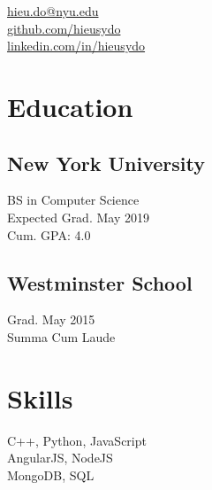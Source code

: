 \documentclass[]{hieudo-build}
\begin{document}
%
%
{
	\faEnvelope \href{mailto:hieu.do@nyu.edu}{ hieu.do@nyu.edu}\\
	\faGithub \href{https://github.com/hieusydo}{   github.com/hieusydo}\\
	\faLinkedinSquare \href{https://www.linkedin.com/in/hieusydo}{   linkedin.com/in/hieusydo}
}
    
%
%
\begin{minipage}[t]{0.34\textwidth} 

\section{Education} 

\subsection{New York University}
BS in Computer Science \\
Expected Grad. May 2019 \\
Cum. GPA: 4.0\\
\sectionsep

\subsection{Westminster School}
Grad. May 2015 \\
Summa Cum Laude \\
\sectionsep

\section{Skills}
C++, Python, JavaScript\\ 

AngularJS, NodeJS \\

MongoDB, SQL \\


\end{minipage}
\end{document}
